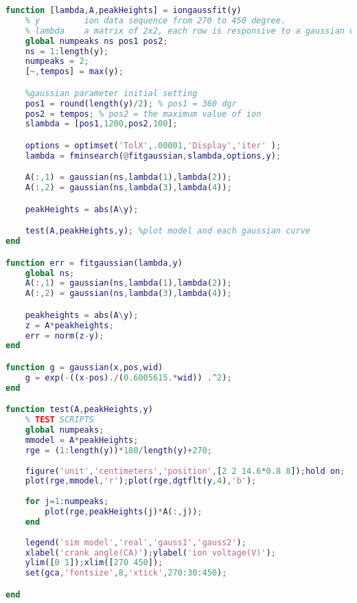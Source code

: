 \begin{lstlisting}[frame=single,language=matlab]
function [lambda,A,peakHeights] = iongaussfit(y)
	% y         ion data sequence from 270 to 450 degree.
	% lambda    a matrix of 2x2, each row is responsive to a gaussian curve
	global numpeaks ns pos1 pos2;
	ns = 1:length(y);
	numpeaks = 2;
	[~,tempos] = max(y);

	%gaussian parameter initial setting
	pos1 = round(length(y)/2); % pos1 = 360 dgr
	pos2 = tempos; % pos2 = the maximum value of ion
	slambda = [pos1,1200,pos2,100];

	options = optimset('TolX',.00001,'Display','iter' );
	lambda = fminsearch(@fitgaussian,slambda,options,y);

	A(:,1) = gaussian(ns,lambda(1),lambda(2));
	A(:,2) = gaussian(ns,lambda(3),lambda(4));

	peakHeights = abs(A\y);

	test(A,peakHeights,y); %plot model and each gaussian curve
end

function err = fitgaussian(lambda,y)
	global ns;
	A(:,1) = gaussian(ns,lambda(1),lambda(2));
	A(:,2) = gaussian(ns,lambda(3),lambda(4));

	peakheights = abs(A\y);
	z = A*peakheights;
	err = norm(z-y);
end

function g = gaussian(x,pos,wid)
	g = exp(-((x-pos)./(0.6005615.*wid)) .^2);
end

function test(A,peakHeights,y)
	% TEST SCRIPTS
	global numpeaks;
	mmodel = A*peakHeights;
	rge = (1:length(y))*180/length(y)+270;
	
	figure('unit','centimeters','position',[2 2 14.6*0.8 8]);hold on;
	plot(rge,mmodel,'r');plot(rge,dgtflt(y,4),'b');
	
	for j=1:numpeaks;
		plot(rge,peakHeights(j)*A(:,j));
	end
	
	legend('sim model','real','gauss1','gauss2');
	xlabel('crank angle(CA)');ylabel('ion voltage(V)');
	ylim([0 1]);xlim([270 450]);
	set(gca,'fontsize',8,'xtick',270:30:450);

end
\end{lstlisting}